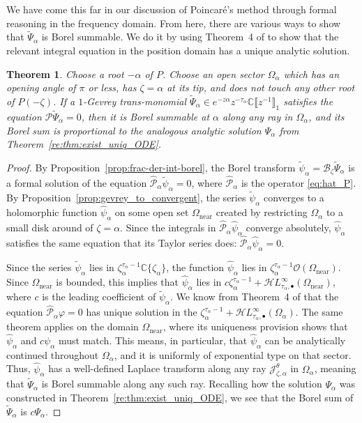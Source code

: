 \documentclass{article}
\newcommand{\singexp}[2]{\mathcal{H}L^\infty_{#1, #2}}
\newcommand{\singexpalg}[1]{\singexp{#1}{\bullet}}
\newcommand{\C}{\mathbb{C}}
\newcommand{\series}[1]{\tilde{#1}}
\newcommand{\borel}{\mathcal{B}}
\theoremstyle{definition}
\theoremstyle{plain}
\newtheorem{theorem}{Theorem}[section]
\begin{document}
We have come this far in our discussion of Poincar\'{e}'s method through formal reasoning in the frequency domain. From here, there are various ways to show that $\series{\Psi}_\alpha$ is Borel summable. We do it by using Theorem~4 of \cite{reg-sing-volterra} to show that the relevant integral equation in the position domain has a unique analytic solution.
\begin{theorem}\label{thm:summability_ODE}
Choose a root $-\alpha$ of $P$. Choose an open sector $\Omega_\alpha$ which has an opening angle of $\pi$ or less, has $\zeta = \alpha$ at its tip, and does not touch any other root of $P(-\zeta)$. If a $1$-Gevrey trans-monomial $\series{\Psi}_\alpha \in e^{-z\alpha} z^{-\tau_\alpha}\C\llbracket z^{-1} \rrbracket_1$ satisfies the equation $\mathcal{P} \series{\Psi}_\alpha = 0$, then it is Borel summable at $\alpha$ along any ray in $\Omega_\alpha$, and its Borel sum is proportional to the analogous analytic solution $\Psi_\alpha$ from Theorem~\ref{re:thm:exist_uniq_ODE}.
\end{theorem}
\begin{proof}
By Proposition~\ref{prop:frac-der-int-borel}, the Borel transform $\series{\psi}_\alpha = \borel_\zeta \series{\Psi}_\alpha$ is a formal solution of the equation $\hat{\mathcal{P}}_\alpha \series{\psi}_\alpha = 0$, where $\hat{\mathcal{P}}_\alpha$ is the operator \eqref{eq:hat_P}. By Proposition~\ref{prop:gevrey_to_convergent}, the series $\series{\psi}_\alpha$ converges to a holomorphic function $\hat{\psi}_\alpha$ on some open set $\Omega_\text{near}$ created by restricting $\Omega_\alpha$ to a small disk around of $\zeta = \alpha$. Since the integrals in $\hat{\mathcal{P}}_\alpha \hat{\psi}_\alpha$ converge absolutely, $\hat{\psi}_\alpha$ satisfies the same equation that its Taylor series does: $\hat{\mathcal{P}}_\alpha \hat{\psi}_\alpha = 0$.

Since the series $\series{\psi}_\alpha$ lies in $\zeta_\alpha^{\tau_\alpha-1} \C\{\zeta_\alpha\}$, the function $\hat{\psi}_\alpha$ lies in $\zeta_\alpha^{\tau_\alpha-1} \mathcal{O}(\Omega_\text{near})$. Since $\Omega_\text{near}$ is bounded, this implies that $\hat{\psi}_\alpha$ lies in $c \zeta_\alpha^{\tau_\alpha-1} + \singexpalg{\tau_\alpha}(\Omega_\text{near})$, where $c$ is the leading coefficient of $\series{\psi}_\alpha$. We know from Theorem~4 of \cite{reg-sing-volterra} that the equation $\hat{\mathcal{P}}_\alpha \varphi = 0$ has unique solution in the $\zeta_\alpha^{\tau_\alpha-1} + \singexpalg{\tau_\alpha}(\Omega_\alpha)$. The same theorem applies on the domain $\Omega_\text{near}$, where its uniqueness provision shows that $\hat{\psi}_\alpha$ and $c\psi_\alpha$ must match. This means, in particular, that $\hat{\psi}_\alpha$ can be analytically continued throughout $\Omega_\alpha$, and it is uniformly of exponential type on that sector. Thus, $\hat{\psi}_\alpha$ has a well-defined Laplace transform along any ray $\mathcal{J}^\theta_{\zeta, \alpha}$ in $\Omega_\alpha$, meaning that $\series{\Psi}_\alpha$ is Borel summable along any such ray. Recalling how the solution $\Psi_\alpha$ was constructed in Theorem~\ref{re:thm:exist_uniq_ODE}, we see that the Borel sum of $\series{\Psi}_\alpha$ is $c\Psi_\alpha$.
\end{proof}
\end{document}
